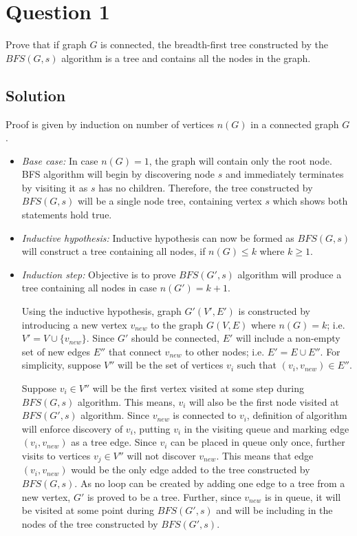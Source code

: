 
\section*{Question 1}

Prove that if graph $G$ is connected, the breadth-first tree constructed by the $BFS(G, s)$ algorithm is a tree and contains all the nodes in the graph.

\subsection*{Solution}

Proof is given by induction on number of vertices $n(G)$ in a connected graph $G$.
\begin{itemize}\itemsep=0pt
  \item[] \textit{Base case:} In case $n(G) = 1$, the graph will contain only the root node.
BFS algorithm will begin by discovering node $s$ and immediately terminates by visiting it as $s$ has no children.
Therefore, the tree constructed by $BFS(G,s)$ will be a single node tree, containing vertex $s$ which shows both statements hold true.
  \item[] \textit{Inductive hypothesis:} Inductive hypothesis can now be formed as $BFS(G,s)$ will construct a tree containing all nodes, if $n(G)\leq k$ where $k \geq 1$.
  \item[] \textit{Induction step:} Objective is to prove $BFS(G',s)$ algorithm will produce a tree containing all nodes in case $n(G')=k+1$.

  Using the inductive hypothesis, graph $G'(V',E')$ is constructed by introducing a new vertex $v_{new}$ to the graph $G(V,E)$ where $n(G) = k$; i.e.
$V' = V \cup \{v_{new}\}$.
  Since $G'$ should be connected, $E'$ will include a non-empty set of new edges $E''$ that connect $v_{new}$ to other nodes; i.e. $E' = E \cup E''$.
For simplicity, suppose $V''$ will be the set of vertices $v_i$ such that $(v_i,v_{new})\in E''$.

  Suppose $v_i \in V''$ will be the first vertex visited at some step during $BFS(G,s)$ algorithm.
This means, $v_i$ will also be the first node visited at $BFS(G',s)$ algorithm.
Since $v_{new}$ is connected to $v_i$, definition of algorithm will enforce discovery of $v_i$, putting $v_i$ in the visiting queue and marking edge $(v_i,v_{new})$ as a tree edge.
Since $v_i$ can be placed in queue only once, further visits to vertices $v_j \in V''$ will not discover $v_{new}$.
This means that edge $(v_i,v_{new})$ would be the only edge added to the tree constructed by $BFS(G,s)$.
As no loop can be created by adding one edge to a tree from a new vertex, $G'$ is proved to be a tree.
Further, since $v_{new}$ is in queue, it will be visited at some point during $BFS(G',s)$ and will be including in the nodes of the tree constructed by $BFS(G',s)$.
\end{itemize}
